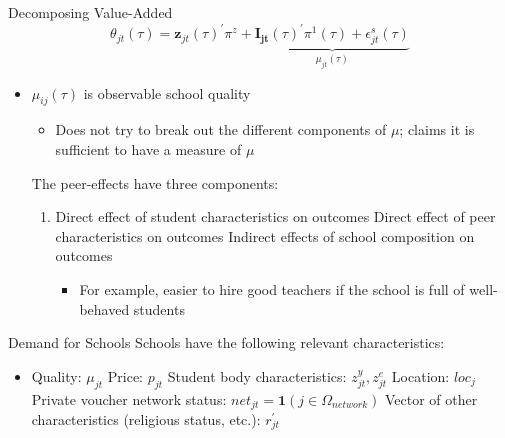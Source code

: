 \documentclass[dvipsnames]{beamer}
\begin{document}
%
\begin{frame}{Decomposing Value-Added}
  \[
\theta_{j t}(\tau)=\mathbf{z}_{j t}(\tau)^{\prime} \pi^{z}+\underbrace{\mathbf{I}_{\mathbf{j t}}(\tau)^{\prime} \pi^{1}(\tau)+\epsilon_{j t}^{s}(\tau)}_{\mu_{j t}(\tau)}
  \] 
  \begin{itemize}
  \item $\mu_{ij}(\tau)$ is observable school quality
    \begin{itemize}
    \item Does not try to break out the different components of $\mu$; claims it is sufficient to have a measure of $\mu$
    \end{itemize}
    \vitem The peer-effects have three components:
    \begin{enumerate}
    \item Direct effect of student characteristics on outcomes
      \vitem Direct effect of peer characteristics on outcomes
      \vitem Indirect effects of school composition on outcomes
      \begin{itemize}
      \item For example, easier to hire good teachers if the school is full of well-behaved students
      \end{itemize}
    \end{enumerate}
  \end{itemize}
\end{frame}
%
\begin{frame}{Demand for Schools}
  Schools have the following relevant characteristics:
  \begin{itemize}
  \item Quality: $\mu_{jt}$
    \vitem Price: $p_{jt}$
    \vitem Student body characteristics: $z_{jt}^y, z_{jt}^e$
    \vitem Location: $loc_j$
    \vitem Private voucher network status: $net_{jt} = \mathbf{1}(j \in \Omega_{network})$
    \vitem Vector of other characteristics (religious status, etc.): $r_{jt}^\prime$
  \end{itemize}
\end{frame}
%
\end{document}
